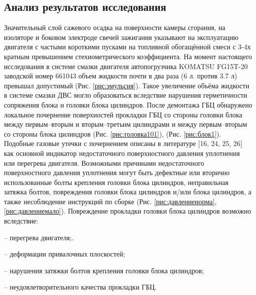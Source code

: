 \subsection{Анализ результатов исследования}

Значительный слой сажевого осадка на поверхности камеры сгорания, на изоляторе и боковом электроде свечей зажигания указывают на эксплуатацию двигателя  с частыми короткими пусками на топливной обогащённой смеси с 3-4х  кратным превышением стехиометрического коэффициента. На момент настоящего исследования  в системе смазки двигателя автопогрузчика KOMATSU FG15T-20 заводской номер 661043  объем жидкости почти в два раза (6 л. против 3.7 л) превышал допустимый (Рис. \ref{рис:эмульсия}).  Такое увеличение объёма жидкости в системе смазки ДВС могло образоваться вследствие нарушения герметичности сопряжения блока и головки блока цилиндров.    После демонтажа ГБЦ  обнаружено  локальное почернение  поверхностей прокладки ГБЦ со стороны головки блока между первым--вторым и вторым--третьим  цилиндрами и между первым--вторым со стороны блока цилиндров (Рис. \ref{рис:головка101}), (Рис. \ref{рис:блок1}). Подобные газовые утечки с почернением  описаны в литературе [16, 24, 25, 26] как основной индикатор недостаточного поверхностного давления  уплотнения или перегрева двигателя.  Возможными причинами недостаточного поверхностного давления уплотнения могут быть дефектные или вторично использованные болты крепления головки блока цилиндров, неправильная затяжка болтов, повреждения головки блока цилиндров и/или блока цилиндров, а также несоблюдение инструкций по сборке (Рис. \ref{рис:давлениенорма}, \ref{рис:давлениемало}).
Повреждение прокладки головки блока цилиндров возможно вследствие:

\begin{compactlist}
    \item [--] перегрева двигателя;.
    \item [--] деформации привалочных  плоскостей;  
    \item [--] нарушения затяжки болтов крепления головки блока цилиндров;
    \item [--] неудовлетворительного качества  прокладки ГБЦ.
\end{compactlist}



